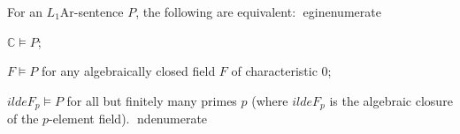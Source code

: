 For an $L_1\mathrm{Ar}$-sentence $P$, the following are equivalent:
egin{enumerate}
\item[(i)] $\mathbb{C} \models P$;
\item[(ii)] $F \models P$ for any algebraically closed field $F$ of characteristic 0;
\item[(iii)] $	ilde{F}_p \models P$ for all but finitely many primes $p$ (where $	ilde{F}_p$ is the algebraic closure of the $p$-element field).
nd{enumerate}
